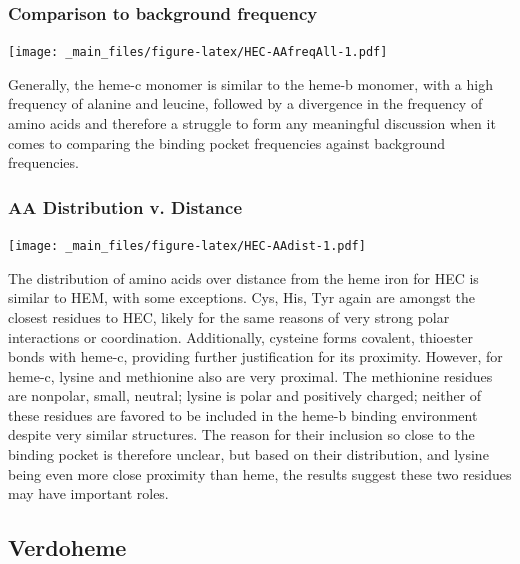 \documentclass[a4paper, nobind]{templates/ociamthesis}
\let\origfigure\figure
\let\endorigfigure\endfigure
\renewenvironment{figure}[1][2] {
    \expandafter\origfigure\expandafter[H]
} {
    \endorigfigure
}
\begin{document}
\hypertarget{comparison-to-background-frequency}{%
\subsubsection{Comparison to background frequency}\label{comparison-to-background-frequency}}

\begin{figure}
\centering
\texttt{[image: \_main\_files/figure-latex/HEC-AAfreqAll-1.pdf]}
\caption{\label{fig:HEC-AAfreqAll}HEC: AA Frequency of Monomer}
\end{figure}

Generally, the heme-c monomer is similar to the heme-b monomer, with a high frequency of alanine and leucine, followed by a divergence in the frequency of amino acids and therefore a struggle to form any meaningful discussion when it comes to comparing the binding pocket frequencies against background frequencies.

\hypertarget{aa-distribution-v.-distance}{%
\subsubsection{AA Distribution v. Distance}\label{aa-distribution-v.-distance}}

\begin{figure}
\centering
\texttt{[image: \_main\_files/figure-latex/HEC-AAdist-1.pdf]}
\caption{\label{fig:HEC-AAdist}HEC: AA Distances}
\end{figure}

The distribution of amino acids over distance from the heme iron for HEC is similar to HEM, with some exceptions. Cys, His, Tyr again are amongst the closest residues to HEC, likely for the same reasons of very strong polar interactions or coordination. Additionally, cysteine forms covalent, thioester bonds with heme-c, providing further justification for its proximity. However, for heme-c, lysine and methionine also are very proximal. The methionine residues are nonpolar, small, neutral; lysine is polar and positively charged; neither of these residues are favored to be included in the heme-b binding environment despite very similar structures. The reason for their inclusion so close to the binding pocket is therefore unclear, but based on their distribution, and lysine being even more close proximity than heme, the results suggest these two residues may have important roles.

\hypertarget{verdoheme-1}{%
\subsection{Verdoheme}\label{verdoheme-1}}
\end{document}
